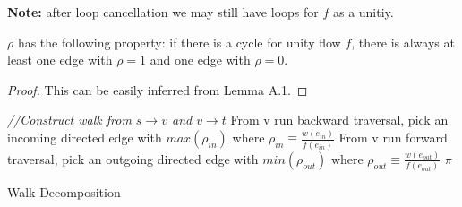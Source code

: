 \textbf{Note:} after loop cancellation we may still have loops for $f$ as a unitiy. 
\begin{lemma}
$\rho$ has the following property: if there is a cycle for unity flow $f$, there is always at least one edge with $\rho =1$ and one edge with $\rho =0$.
\end{lemma}
\begin{proof}
 This can be easily inferred from Lemma A.1.
\end{proof}



\begin{algorithm}[ht]
  \SetAlgoLined\DontPrintSemicolon
  \myalg{\walk{}}  {
\emph{//Construct walk from $s\rightarrow v$ and $v\rightarrow t$}\;
From v run backward traversal, pick an incoming directed edge with $ max( \rho_{in} )  $ where $\rho_{in} \equiv \frac{ w(e_{in})}{f(e_{in})}$\;
From v run forward traversal, pick an outgoing directed edge with $ min(\rho_{out} ) $ where $\rho_{out} \equiv \frac{ w(e_{out})}{f(e_{out})} $\;
 \KwRet $\pi$\;}{}
  \setcounter{AlgoLine}{0}
\caption{Walk Decomposition}\label{cap:algorithm1}
\end{algorithm}


